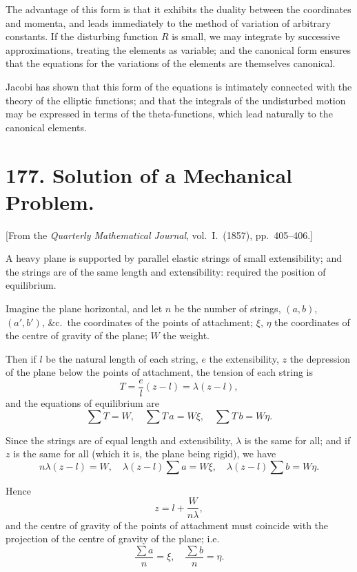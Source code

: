\documentclass[11pt,a4paper]{book}
\begin{document}
The advantage of this form is that it exhibits the duality between the coordinates and momenta, and leads immediately to the method of variation of arbitrary constants. If the disturbing function $R$ is small, we may integrate by successive approximations, treating the elements as variable; and the canonical form ensures that the equations for the variations of the elements are themselves canonical.

Jacobi has shown that this form of the equations is intimately connected with the theory of the elliptic functions; and that the integrals of the undisturbed motion may be expressed in terms of the theta-functions, which lead naturally to the canonical elements.


\newpage
\section*{177. Solution of a Mechanical Problem.}

[From the \textit{Quarterly Mathematical Journal}, vol.~I.~(1857), pp.~405--406.]

A heavy plane is supported by parallel elastic strings of small extensibility; and the strings are of the same length and extensibility: required the position of equilibrium.

Imagine the plane horizontal, and let $n$ be the number of strings, $(a,b)$, $(a',b')$, \&c.\ the coordinates of the points of attachment; $\xi$, $\eta$ the coordinates of the centre of gravity of the plane; $W$ the weight.

Then if $l$ be the natural length of each string, $e$ the extensibility, $z$ the depression of the plane below the points of attachment, the tension of each string is
\[
T = \frac{e}{l}(z - l) = \lambda(z-l),
\]
and the equations of equilibrium are
\[
\sum T = W,\quad
\sum T\, a = W\xi,\quad
\sum T\, b = W\eta.
\]

Since the strings are of equal length and extensibility, $\lambda$ is the same for all; and if $z$ is the same for all (which it is, the plane being rigid), we have
\[
n\lambda(z-l) = W,\quad
\lambda(z-l)\sum a = W\xi,\quad
\lambda(z-l)\sum b = W\eta.
\]

Hence
\[
z = l + \frac{W}{n\lambda},
\]
and the centre of gravity of the points of attachment must coincide with the projection of the centre of gravity of the plane; i.e.
\[
\frac{\sum a}{n} = \xi,\quad \frac{\sum b}{n} = \eta.
\]
\end{document}
